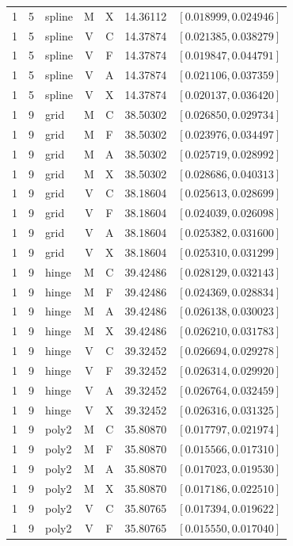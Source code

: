 \begin{longtable}{r r l c c r l}
1 & 5 & spline & M & X & 14.36112 & $[0.018999,0.024946]$ \\
1 & 5 & spline & V & C & 14.37874 & $[0.021385,0.038279]$ \\
1 & 5 & spline & V & F & 14.37874 & $[0.019847,0.044791]$ \\
1 & 5 & spline & V & A & 14.37874 & $[0.021106,0.037359]$ \\
1 & 5 & spline & V & X & 14.37874 & $[0.020137,0.036420]$ \\
1 & 9 & grid & M & C & 38.50302 & $[0.026850,0.029734]$ \\
1 & 9 & grid & M & F & 38.50302 & $[0.023976,0.034497]$ \\
1 & 9 & grid & M & A & 38.50302 & $[0.025719,0.028992]$ \\
1 & 9 & grid & M & X & 38.50302 & $[0.028686,0.040313]$ \\
1 & 9 & grid & V & C & 38.18604 & $[0.025613,0.028699]$ \\
1 & 9 & grid & V & F & 38.18604 & $[0.024039,0.026098]$ \\
1 & 9 & grid & V & A & 38.18604 & $[0.025382,0.031600]$ \\
1 & 9 & grid & V & X & 38.18604 & $[0.025310,0.031299]$ \\
1 & 9 & hinge & M & C & 39.42486 & $[0.028129,0.032143]$ \\
1 & 9 & hinge & M & F & 39.42486 & $[0.024369,0.028834]$ \\
1 & 9 & hinge & M & A & 39.42486 & $[0.026138,0.030023]$ \\
1 & 9 & hinge & M & X & 39.42486 & $[0.026210,0.031783]$ \\
1 & 9 & hinge & V & C & 39.32452 & $[0.026694,0.029278]$ \\
1 & 9 & hinge & V & F & 39.32452 & $[0.026314,0.029920]$ \\
1 & 9 & hinge & V & A & 39.32452 & $[0.026764,0.032459]$ \\
1 & 9 & hinge & V & X & 39.32452 & $[0.026316,0.031325]$ \\
1 & 9 & poly2 & M & C & 35.80870 & $[0.017797,0.021974]$ \\
1 & 9 & poly2 & M & F & 35.80870 & $[0.015566,0.017310]$ \\
1 & 9 & poly2 & M & A & 35.80870 & $[0.017023,0.019530]$ \\
1 & 9 & poly2 & M & X & 35.80870 & $[0.017186,0.022510]$ \\
1 & 9 & poly2 & V & C & 35.80765 & $[0.017394,0.019622]$ \\
1 & 9 & poly2 & V & F & 35.80765 & $[0.015550,0.017040]$ \\

\end{longtable}
